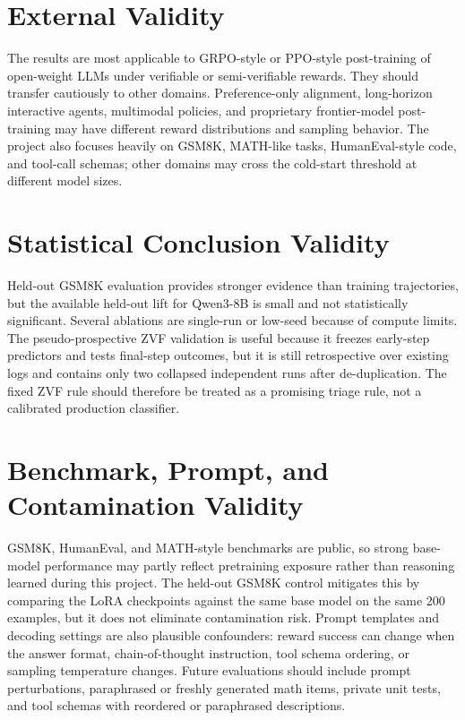 \documentclass[12pt,a4paper]{report}
\begin{document}
\section*{External Validity}
The results are most applicable to GRPO-style or PPO-style post-training of open-weight LLMs under verifiable or semi-verifiable rewards. They should transfer cautiously to other domains. Preference-only alignment, long-horizon interactive agents, multimodal policies, and proprietary frontier-model post-training may have different reward distributions and sampling behavior. The project also focuses heavily on GSM8K, MATH-like tasks, HumanEval-style code, and tool-call schemas; other domains may cross the cold-start threshold at different model sizes.

\section*{Statistical Conclusion Validity}
Held-out GSM8K evaluation provides stronger evidence than training trajectories, but the available held-out lift for Qwen3-8B is small and not statistically significant. Several ablations are single-run or low-seed because of compute limits. The pseudo-prospective ZVF validation is useful because it freezes early-step predictors and tests final-step outcomes, but it is still retrospective over existing logs and contains only two collapsed independent runs after de-duplication. The fixed ZVF rule should therefore be treated as a promising triage rule, not a calibrated production classifier.

\section*{Benchmark, Prompt, and Contamination Validity}
GSM8K, HumanEval, and MATH-style benchmarks are public, so strong base-model performance may partly reflect pretraining exposure rather than reasoning learned during this project. The held-out GSM8K control mitigates this by comparing the LoRA checkpoints against the same base model on the same 200 examples, but it does not eliminate contamination risk. Prompt templates and decoding settings are also plausible confounders: reward success can change when the answer format, chain-of-thought instruction, tool schema ordering, or sampling temperature changes. Future evaluations should include prompt perturbations, paraphrased or freshly generated math items, private unit tests, and tool schemas with reordered or paraphrased descriptions.
\end{document}

